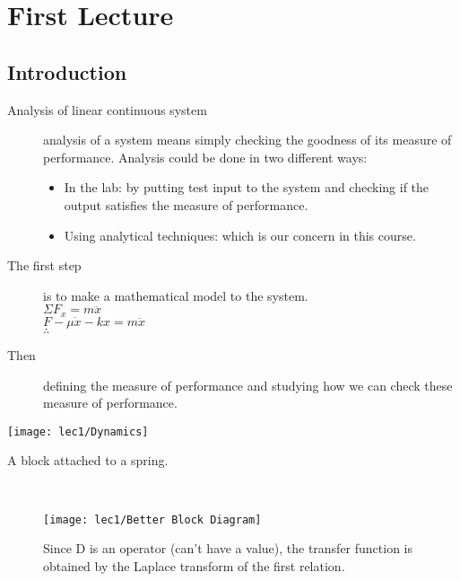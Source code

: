 \setchapterpreamble[u]{\margintoc}
\chapter{First Lecture}




\section{Introduction}

\begin{description}
	\item[Analysis of linear continuous system] analysis of a system means simply checking the goodness of its measure of performance.
Analysis could be done in two different ways:
\begin{itemize}
	\item In the lab: by putting test input to the system and checking if the output satisfies the measure of performance.
	\item Using analytical techniques: which is our concern in this course.
\end{itemize}
	\item[The first step] is to make a mathematical model to the system. \\[+1mm]
	$\Sigma F_x = m\ddot{x}$\\
	$F - \mu\dot{x} - kx = m\ddot{x}$\\
	$\therefore$
	\\[-2mm]
	\item[Then] defining the measure of performance and studying how we can check these measure of performance.
\end{description}

\begin{marginfigure}[-3cm]
		\texttt{[image: lec1/Dynamics]}
		\caption[Spring problem: figure]{A block attached to a spring.}
\end{marginfigure}

 \leavevmode\\[-1.6cm]
 \begin{figure}[hb]
		\raggedleft
		\texttt{[image: lec1/Better Block Diagram]}
		\caption[Spring problem: block diagram]{Since D is an operator (can't have a value),  the transfer function is obtained by the Laplace transform of the first relation.}
\end{figure}
\leavevmode\\[-1.4cm]

